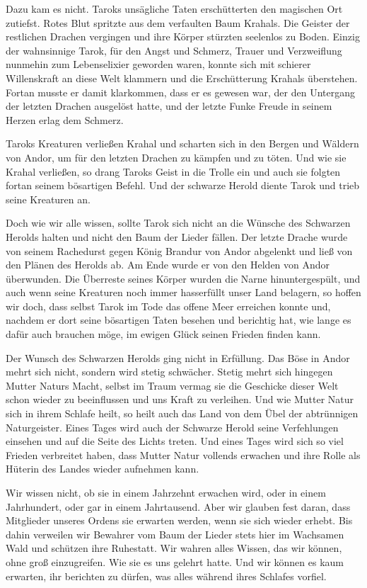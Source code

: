 Dazu kam es nicht. Taroks unsägliche Taten erschütterten den magischen Ort zutiefst. Rotes Blut spritzte aus dem verfaulten Baum Krahals. Die Geister der restlichen Drachen vergingen und ihre Körper stürzten seelenlos zu Boden. Einzig der wahnsinnige Tarok, für den Angst und Schmerz, Trauer und Verzweiflung nunmehin zum Lebenselixier geworden waren, konnte sich mit schierer Willenskraft an diese Welt klammern und die Erschütterung Krahals überstehen. Fortan musste er damit klarkommen, dass er es gewesen war, der den Untergang der letzten Drachen ausgelöst hatte, und der letzte Funke Freude in seinem Herzen erlag dem Schmerz.

Taroks Kreaturen verließen Krahal und scharten sich in den Bergen und Wäldern von Andor, um für den letzten Drachen zu kämpfen und zu töten. Und wie sie Krahal verließen, so drang Taroks Geist in die Trolle ein und auch sie folgten fortan seinem bösartigen Befehl. Und der schwarze Herold diente Tarok und trieb seine Kreaturen an.

Doch wie wir alle wissen, sollte Tarok sich nicht an die Wünsche des Schwarzen Herolds halten und nicht den Baum der Lieder fällen. Der letzte Drache wurde von seinem Rachedurst gegen König Brandur von Andor abgelenkt und ließ von den Plänen des Herolds ab. Am Ende wurde er von den Helden von Andor überwunden. Die Überreste seines Körper wurden die Narne hinuntergespült, und auch wenn seine Kreaturen noch immer hasserfüllt unser Land belagern, so hoffen wir doch, dass selbst Tarok im Tode das offene Meer erreichen konnte und, nachdem er dort seine bösartigen Taten besehen und berichtig hat, wie lange es dafür auch brauchen möge, im ewigen Glück seinen Frieden finden kann.

Der Wunsch des Schwarzen Herolds ging nicht in Erfüllung. Das Böse in Andor mehrt sich nicht, sondern wird stetig schwächer. Stetig mehrt sich hingegen Mutter Naturs Macht, selbst im Traum vermag sie die Geschicke dieser Welt schon wieder zu beeinflussen und uns Kraft zu verleihen. Und wie Mutter Natur sich in ihrem Schlafe heilt, so heilt auch das Land von dem Übel der abtrünnigen Naturgeister. Eines Tages wird auch der Schwarze Herold seine Verfehlungen einsehen und auf die Seite des Lichts treten. Und eines Tages wird sich so viel Frieden verbreitet haben, dass Mutter Natur vollends erwachen und ihre Rolle als Hüterin des Landes wieder aufnehmen kann.

Wir wissen nicht, ob sie in einem Jahrzehnt erwachen wird, oder in einem Jahrhundert, oder gar in einem Jahrtausend. Aber wir glauben fest daran, dass Mitglieder unseres Ordens sie erwarten werden, wenn sie sich wieder erhebt. Bis dahin verweilen wir Bewahrer vom Baum der Lieder stets hier im Wachsamen Wald und schützen ihre Ruhestatt. Wir wahren alles Wissen, das wir können, ohne groß einzugreifen. Wie sie es uns gelehrt hatte. Und wir können es kaum erwarten, ihr berichten zu dürfen, was alles während ihres Schlafes vorfiel.
